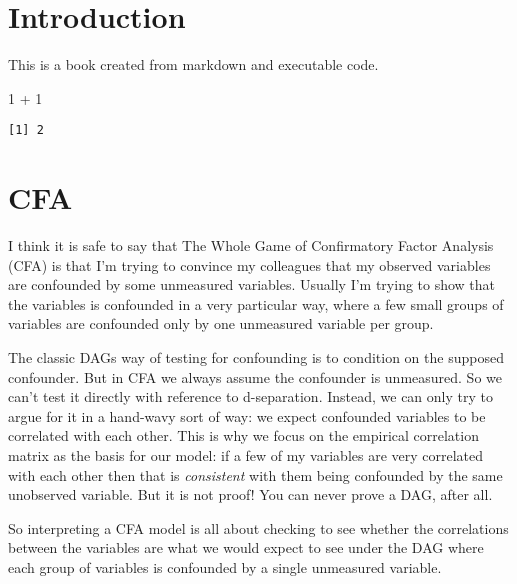 \documentclass[
  letterpaper,
  DIV=11,
  numbers=noendperiod]{scrreprt}
\newenvironment{Shaded}{\begin{snugshade}}{\end{snugshade}}
\newcommand{\DecValTok}[1]{\textcolor[rgb]{0.68,0.00,0.00}{#1}}
\newcommand{\SpecialCharTok}[1]{\textcolor[rgb]{0.37,0.37,0.37}{#1}}
\begin{document}

\hypertarget{introduction}{%
\chapter{Introduction}\label{introduction}}

This is a book created from markdown and executable code.

\begin{Shaded}
\begin{Highlighting}[]
\DecValTok{1} \SpecialCharTok{+} \DecValTok{1}
\end{Highlighting}
\end{Shaded}

\begin{verbatim}
[1] 2
\end{verbatim}


\hypertarget{cfa}{%
\chapter{CFA}\label{cfa}}

I think it is safe to say that The Whole Game of Confirmatory Factor
Analysis (CFA) is that I'm trying to convince my colleagues that my
observed variables are confounded by some unmeasured variables. Usually
I'm trying to show that the variables is confounded in a very particular
way, where a few small groups of variables are confounded only by one
unmeasured variable per group.

The classic DAGs way of testing for confounding is to condition on the
supposed confounder. But in CFA we always assume the confounder is
unmeasured. So we can't test it directly with reference to d-separation.
Instead, we can only try to argue for it in a hand-wavy sort of way: we
expect confounded variables to be correlated with each other. This is
why we focus on the empirical correlation matrix as the basis for our
model: if a few of my variables are very correlated with each other then
that is \emph{consistent} with them being confounded by the same
unobserved variable. But it is not proof! You can never prove a DAG,
after all.

So interpreting a CFA model is all about checking to see whether the
correlations between the variables are what we would expect to see under
the DAG where each group of variables is confounded by a single
unmeasured variable.
\end{document}

